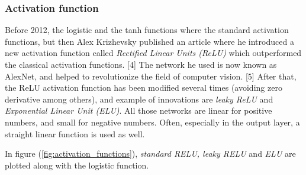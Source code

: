 \subsubsection{Activation function}
Before 2012, the logistic and the tanh functions where the standard activation functions, but then Alex Krizhevsky published an article where he introduced a new activation function called \textit{Rectified Linear Units (ReLU)} which outperformed the classical activation functions. [4] The network he used is now known as AlexNet, and helped to revolutionize the field of computer vision. [5] After that, the ReLU activation function has been modified several times (avoiding zero derivative among others), and example of innovations are \textit{leaky ReLU} and \textit{Exponential Linear Unit (ELU)}. All those networks are linear for positive numbers, and small for negative numbers. Often, especially in the output layer, a straight linear function is used as well.

In figure (\ref{fig:activation_functions}), \textit{standard RELU, leaky RELU} and \textit{ELU} are plotted along with the logistic function.

